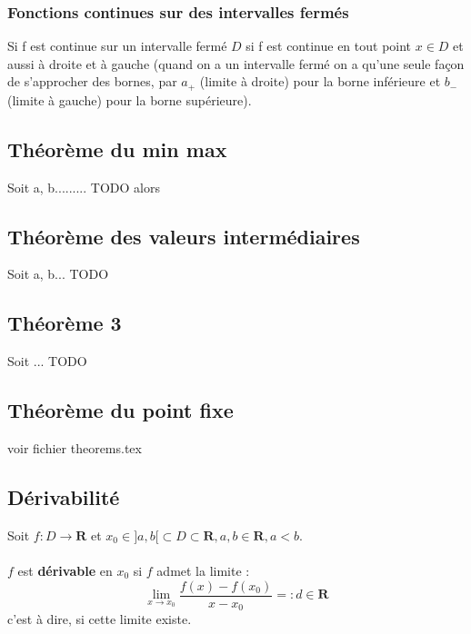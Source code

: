\documentclass{article}
\begin{document}
\subsubsection{Fonctions continues sur des intervalles fermés}

Si f est continue sur un intervalle fermé $ D $ si f est continue en tout point $ x \in D $ et aussi à droite et à gauche (quand on a un intervalle fermé on a qu'une seule façon de s'approcher des bornes, par $ a_+ $ (limite à droite) pour la borne inférieure et $ b_- $ (limite à gauche) pour la borne supérieure).

\subsection{Théorème du min max}

Soit a, b......... TODO alors

\subsection{Théorème des valeurs intermédiaires}

Soit a, b... TODO 

\subsection{Théorème 3}

Soit ... TODO

\subsection{Théorème du point fixe}

voir fichier theorems.tex

\subsection{Dérivabilité}

Soit $ f : D \to \mathbf{R} $ et $ x_0 \in ]a, b[ \subset D \subset \mathbf{R}, a, b \in \mathbf{R}, a < b $.\\\\
$ f $ est \textbf{dérivable} en $ x_0 $ si $ f $ admet la limite :
\[ \lim_{x\to{x_0}} \frac{f(x) - f(x_0)}{x - x_0} =: d \in \mathbf{R} \]
c'est à dire, si cette limite existe.
\end{document}
